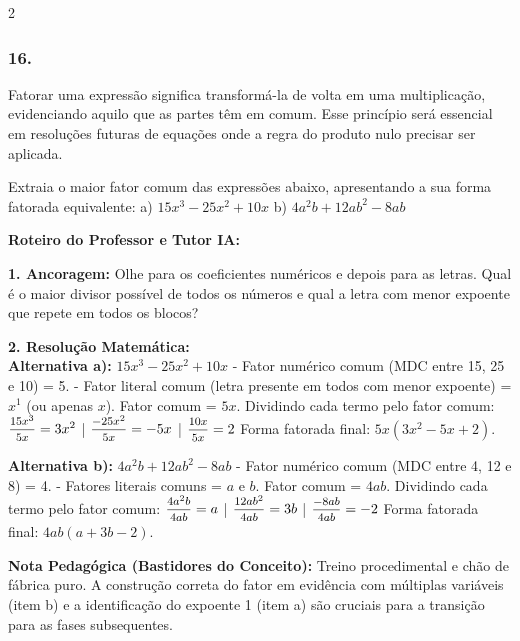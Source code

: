 \begin{multicols*}{2}
\subsubsection*{16.} 
\begin{enunciadoLiteral}
Fatorar uma expressão significa transformá-la de volta em uma multiplicação, evidenciando aquilo que as partes têm em comum. Esse princípio será essencial em resoluções futuras de equações onde a regra do produto nulo precisar ser aplicada.

Extraia o maior fator comum das expressões abaixo, apresentando a sua forma fatorada equivalente:
a) $ 15x^3 - 25x^2 + 10x $
b) $ 4a^2b + 12ab^2 - 8ab $
\end{enunciadoLiteral}

\ifgabarito
    \begin{tcolorbox}[colback=CorTitUm!5, colframe=CorTitUm, boxrule=1pt, arc=4pt, left=6pt, right=6pt, top=6pt, bottom=6pt]
    \small\textbf{\textcolor{CorTitUm}{Roteiro do Professor e Tutor IA:}}\par\vspace{0.1cm}
    \color{CinzaEscuro}
    \textbf{1. Ancoragem:} Olhe para os coeficientes numéricos e depois para as letras. Qual é o maior divisor possível de todos os números e qual a letra com menor expoente que repete em todos os blocos?\par\vspace{0.1cm}
    \textbf{2. Resolução Matemática:}\\
    \textbf{Alternativa a):} $ 15x^3 - 25x^2 + 10x $
    - Fator numérico comum (MDC entre 15, 25 e 10) = 5.
    - Fator literal comum (letra presente em todos com menor expoente) = $ x^1 $ (ou apenas $ x $).
    Fator comum = $ 5x $.
    Dividindo cada termo pelo fator comum:
    $ \mfrac{15x^3}{5x} = 3x^2 $ | $ \mfrac{-25x^2}{5x} = -5x $ | $ \mfrac{10x}{5x} = 2 $
    Forma fatorada final: $ 5x(3x^2 - 5x + 2) $.
    
    \textbf{Alternativa b):} $ 4a^2b + 12ab^2 - 8ab $
    - Fator numérico comum (MDC entre 4, 12 e 8) = 4.
    - Fatores literais comuns = $ a $ e $ b $.
    Fator comum = $ 4ab $.
    Dividindo cada termo pelo fator comum:
    $ \mfrac{4a^2b}{4ab} = a $ | $ \mfrac{12ab^2}{4ab} = 3b $ | $ \mfrac{-8ab}{4ab} = -2 $
    Forma fatorada final: $ 4ab(a + 3b - 2) $.
    \end{tcolorbox}
    \vspace{0.15cm}
    
    \begin{boxexplicacao}
    \textbf{Nota Pedagógica (Bastidores do Conceito):} Treino procedimental e chão de fábrica puro. A construção correta do fator em evidência com múltiplas variáveis (item b) e a identificação do expoente 1 (item a) são cruciais para a transição para as fases subsequentes.
    \end{boxexplicacao}
\fi


\end{multicols*}
